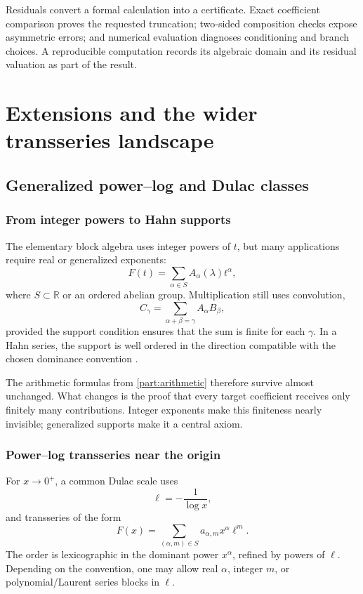 \documentclass[11pt,openany]{book}
\theoremstyle{definition}
\theoremstyle{plain}
\theoremstyle{remark}
\newcommand{\R}{\mathbb{R}}
\begin{document}
\begin{summarybox}
Residuals convert a formal calculation into a certificate. Exact coefficient comparison proves the requested truncation; two-sided composition checks expose asymmetric errors; and numerical evaluation diagnoses conditioning and branch choices. A reproducible computation records its algebraic domain and its residual valuation as part of the result.
\end{summarybox}

\part{Extensions and the wider transseries landscape}\label{part:extensions}

\chapter{Generalized power--log and Dulac classes}\label{ch:extensions}

\section{From integer powers to Hahn supports}
The elementary block algebra uses integer powers of \(t\), but many applications require real or generalized exponents:
\begin{equation}\label{eq:Hahn-power-log}
 F(t)=\sum_{\alpha\in S}A_\alpha(\lambda)t^\alpha,
\end{equation}
where \(S\subset\R\) or an ordered abelian group. Multiplication still uses convolution,
\[
 C_\gamma=\sum_{\alpha+\beta=\gamma}A_\alpha B_\beta,
\]
provided the support condition ensures that the sum is finite for each \(\gamma\). In a Hahn series, the support is well ordered in the direction compatible with the chosen dominance convention \cite{hahn,vdhoeven-book}.

The arithmetic formulas from \cref{part:arithmetic} therefore survive almost unchanged. What changes is the proof that every target coefficient receives only finitely many contributions. Integer exponents make this finiteness nearly invisible; generalized supports make it a central axiom.


\section{Power--log transseries near the origin}
For \(x\to0^+\), a common Dulac scale uses
\[
 \ell=-\frac1{\log x},
\]
and transseries of the form
\begin{equation}\label{eq:Dulac-general-form}
 F(x)=\sum_{(\alpha,m)\in S}a_{\alpha,m}x^\alpha\ell^m.
\end{equation}
The order is lexicographic in the dominant power \(x^\alpha\), refined by powers of \(\ell\). Depending on the convention, one may allow real \(\alpha\), integer \(m\), or polynomial/Laurent series blocks in \(\ell\).
\end{document}
